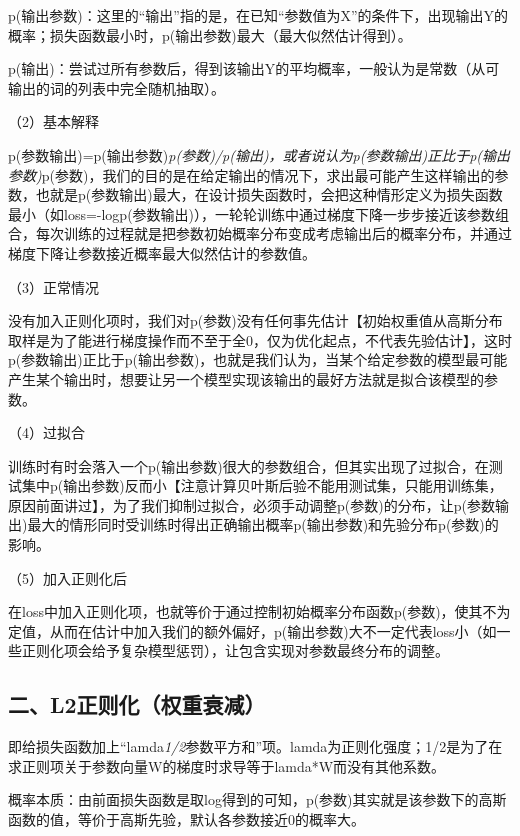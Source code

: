 p(输出\textbar 参数)：这里的``输出''指的是，在已知``参数值为X''的条件下，出现输出Y的概率；损失函数最小时，p(输出\textbar 参数)最大（最大似然估计得到）。

p(输出)：尝试过所有参数后，得到该输出Y的平均概率，一般认为是常数（从可输出的词的列表中完全随机抽取）。

（2）基本解释

p(参数\textbar 输出)=p(输出\textbar 参数)\emph{p(参数)/p(输出)，或者说认为p(参数\textbar 输出)正比于p(输出\textbar 参数)}p(参数)，我们的目的是在给定输出的情况下，求出最可能产生这样输出的参数，也就是p(参数\textbar 输出)最大，在设计损失函数时，会把这种情形定义为损失函数最小（如loss=-logp(参数\textbar 输出)），一轮轮训练中通过梯度下降一步步接近该参数组合，每次训练的过程就是把参数初始概率分布变成考虑输出后的概率分布，并通过梯度下降让参数接近概率最大似然估计的参数值。

（3）正常情况

没有加入正则化项时，我们对p(参数)没有任何事先估计【初始权重值从高斯分布取样是为了能进行梯度操作而不至于全0，仅为优化起点，不代表先验估计】，这时p(参数\textbar 输出)正比于p(输出\textbar 参数)，也就是我们认为，当某个给定参数的模型最可能产生某个输出时，想要让另一个模型实现该输出的最好方法就是拟合该模型的参数。

（4）过拟合

训练时有时会落入一个p(输出\textbar 参数)很大的参数组合，但其实出现了过拟合，在测试集中p(输出\textbar 参数)反而小【注意计算贝叶斯后验不能用测试集，只能用训练集，原因前面讲过】，为了我们抑制过拟合，必须手动调整p(参数)的分布，让p(参数\textbar 输出)最大的情形同时受训练时得出正确输出概率p(输出\textbar 参数)和先验分布p(参数)的影响。

（5）加入正则化后

在loss中加入正则化项，也就等价于通过控制初始概率分布函数p(参数)，使其不为定值，从而在估计中加入我们的额外偏好，p(输出\textbar 参数)大不一定代表loss小（如一些正则化项会给予复杂模型惩罚），让包含实现对参数最终分布的调整。

\hypertarget{ux4e8cl2ux6b63ux5219ux5316ux6743ux91cdux8870ux51cf}{%
\subsection{二、L2正则化（权重衰减）}\label{ux4e8cl2ux6b63ux5219ux5316ux6743ux91cdux8870ux51cf}}

即给损失函数加上``lamda\emph{1/2}参数平方和''项。lamda为正则化强度；1/2是为了在求正则项关于参数向量W的梯度时求导等于lamda*W而没有其他系数。

概率本质：由前面损失函数是取log得到的可知，p(参数)其实就是该参数下的高斯函数的值，等价于高斯先验，默认各参数接近0的概率大。

